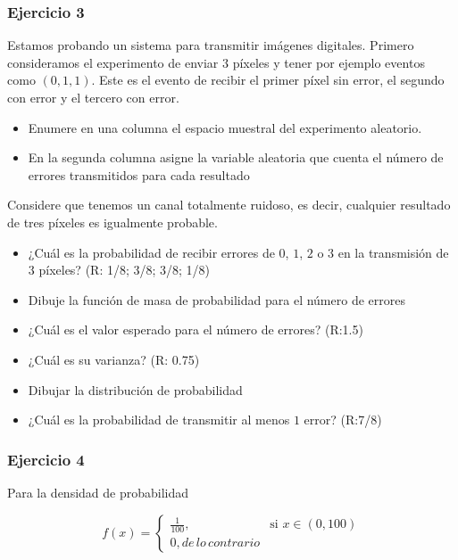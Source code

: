 \documentclass[
]{book}
\begin{document}
\hypertarget{ejercicio-3-1}{%
\subsubsection{Ejercicio 3}\label{ejercicio-3-1}}

Estamos probando un sistema para transmitir imágenes digitales. Primero consideramos el experimento de enviar \(3\) píxeles y tener por ejemplo eventos como \((0,1,1)\). Este es el evento de recibir el primer píxel sin error, el segundo con error y el tercero con error.

\begin{itemize}
\item
  Enumere en una columna el espacio muestral del experimento aleatorio.
\item
  En la segunda columna asigne la variable aleatoria que cuenta el número de errores transmitidos para cada resultado
\end{itemize}

Considere que tenemos un canal totalmente ruidoso, es decir, cualquier resultado de tres píxeles es igualmente probable.

\begin{itemize}
\item
  ¿Cuál es la probabilidad de recibir errores de \(0\), \(1\), \(2\) o \(3\) en la transmisión de \(3\) píxeles? (R: 1/8; 3/8; 3/8; 1/8)
\item
  Dibuje la función de masa de probabilidad para el número de errores
\item
  ¿Cuál es el valor esperado para el número de errores? (R:1.5)
\item
  ¿Cuál es su varianza? (R: 0.75)
\item
  Dibujar la distribución de probabilidad
\item
  ¿Cuál es la probabilidad de transmitir al menos \(1\) error?
  (R:7/8)
\end{itemize}

\hypertarget{ejercicio-4-1}{%
\subsubsection{Ejercicio 4}\label{ejercicio-4-1}}

Para la densidad de probabilidad

\[
    f(x)=
\begin{cases}
    \frac{1}{100},& \text{si } x\in (0,100)\\
    0, de\, lo\, contrario
\end{cases}
\]
\end{document}

